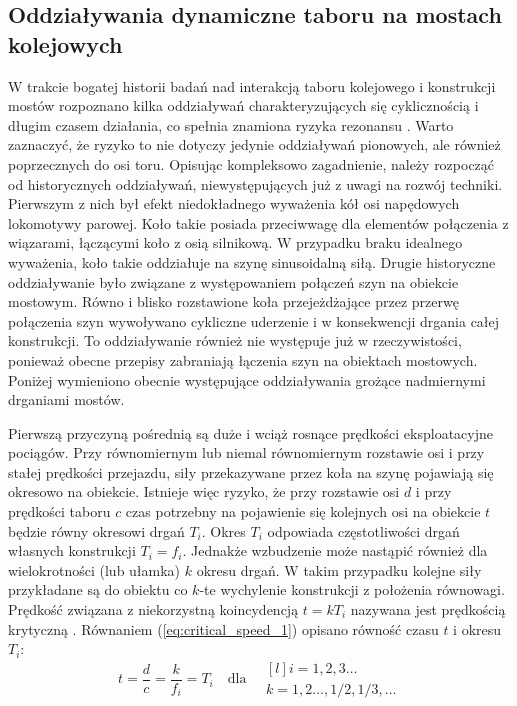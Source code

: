 \subsection{Oddziaływania dynamiczne taboru na mostach kolejowych}
W trakcie bogatej historii badań nad interakcją taboru kolejowego i konstrukcji mostów rozpoznano kilka oddziaływań charakteryzujących się cyklicznością i długim czasem działania, co spełnia znamiona ryzyka rezonansu \parencite{Fryba2001}. Warto zaznaczyć, że ryzyko to nie dotyczy jedynie oddziaływań pionowych, ale również poprzecznych do osi toru. Opisując kompleksowo zagadnienie, należy rozpocząć od historycznych oddziaływań, niewystępujących już z uwagi na rozwój techniki. Pierwszym z nich był efekt niedokładnego wyważenia kół osi napędowych lokomotywy parowej. Koło takie posiada przeciwwagę dla elementów połączenia z wiązarami, łączącymi koło z osią silnikową. W przypadku braku idealnego wyważenia, koło takie oddziałuje na szynę sinusoidalną siłą. Drugie historyczne oddziaływanie było związane z występowaniem połączeń szyn na obiekcie mostowym. Równo i blisko rozstawione koła przejeżdżające przez przerwę połączenia szyn wywoływano cykliczne uderzenie i w konsekwencji drgania całej konstrukcji. To oddziaływanie również nie występuje już w rzeczywistości, ponieważ obecne przepisy zabraniają łączenia szyn na obiektach mostowych. Poniżej wymieniono obecnie występujące oddziaływania grożące nadmiernymi drganiami mostów.
 
Pierwszą przyczyną pośrednią są duże i wciąż rosnące prędkości eksploatacyjne pociągów. Przy równomiernym lub niemal równomiernym rozstawie osi i przy stałej prędkości przejazdu, siły przekazywane przez koła na szynę pojawiają się okresowo na obiekcie. Istnieje więc ryzyko, że przy rozstawie osi $d$ i przy prędkości taboru $c$ czas potrzebny na pojawienie się kolejnych osi na obiekcie $t$ będzie równy okresowi drgań $T_i$. Okres $T_i$ odpowiada częstotliwości drgań własnych konstrukcji $T_i=f_i$. Jednakże wzbudzenie może nastąpić również dla wielokrotności (lub ułamka) $k$ okresu drgań. W takim przypadku kolejne siły przykładane są do obiektu co $k$-te wychylenie konstrukcji z położenia równowagi. Prędkość związana z niekorzystną koincydencją $t=kT_i$ nazywana jest prędkością krytyczną . Równaniem (\ref{eq:critical_speed_1}) opisano równość czasu $t$ i okresu $T_i$:
\begin{equation} \label{eq:critical_speed_1}
	t=\frac{d}{c}=\frac{k}{f_i}=T_i \quad\text{dla}\quad
	\begin{matrix*}[l]
		i=1,2,3\dots\ \\
		k=1,2\dots,1/2,1/3,\dots
	\end{matrix*}
\end{equation}

